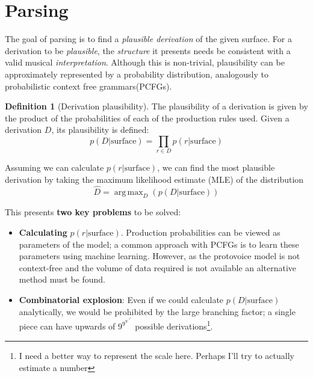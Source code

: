 \documentclass[12pt,a4paper,twoside,openright]{report}
\DeclareMathOperator*{\argmax}{arg\,max}
\theoremstyle{definition}
\newtheorem{definition}{Definition}[section]
\begin{document}
\section{Parsing} %
\label{sub:protovoiceParsing}

The goal of parsing is to find a \textit{plausible derivation} of the given surface. For a derivation to be \textit{plausible}, the \textit{structure} it presents needs be consistent with a valid musical \textit{interpretation}. Although this is non-trivial, plausibility can be approximately represented by a probability distribution, analogously to probabilistic context free grammars(PCFGs).
\par
\par
\begin{definition}[Derivation plausibility]
  The plausibility of a derivation is given by the product of the probabilities of each of the production rules used. Given a derivation $D$, its plausibility is defined:
  \begin{equation}
    p(D|\text{surface}) = \prod_{r \in D}  p(r|\text{surface})
  \end{equation}
\end{definition}


Assuming we can calculate $p(r|\text{surface})$, we can find the most plausible derivation by taking the maximum likelihood estimate (MLE) of the distribution
\begin{equation}
  \hat D = \argmax_{D} \left( p(D|\text{surface})\right)
  \label{eq:mapApproach}
\end{equation}

This presents \textbf{two key problems} to be solved:

\begin{itemize}
  \item \textbf{Calculating} $p(r|\text{surface})$. Production probabilities can be viewed as parameters of the model; a common approach with PCFGs is to learn these parameters using machine learning. However, as the protovoice model is not context-free and the volume of data required is not available an alternative method must be found.
  \item \textbf{Combinatorial explosion}: Even if we could calculate $p(D|\text{surface})$ analytically, we would be prohibited by the large branching factor; a single piece can have upwards of $9^{9^{9^{{\iddots}^{9^{9}}}}}$ possible derivations\footnote{I need a better way to represent the scale here. Perhaps I'll try to actually estimate a number}.
\end{itemize}
\end{document}
